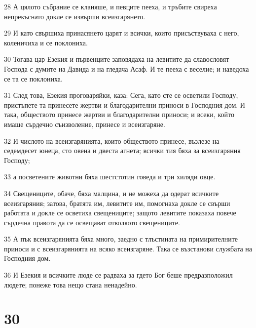 \par 28 А цялото събрание се кланяше, и певците пееха, и тръбите свиреха непрекъснато докле се извърши всеизгарянето.
\par 29 И като свършиха принасянето царят и всички, които присъствуваха с него, коленичиха и се поклониха.
\par 30 Тогава цар Езекия и първенците заповядаха на левитите да славословят Господа с думите на Давида и на гледача Асаф. И те пееха с веселие; и наведоха се та се поклониха.
\par 31 След това, Езекия проговаряйки, каза: Сега, като сте се осветили Господу, пристъпете та принесете жертви и благодарителни приноси в Господния дом. И така, обществото принесе жертви и благодарителни приноси; и всеки, който имаше сърдечно съизволение, принесе и всеизгаряне.
\par 32 И числото на всеизгарянията, които обществото принесе, възлезе на седемдесет юнеца, сто овена и двеста агнета; всички тия бяха за всеизгаряния Господу;
\par 33 а посветените животни бяха шестстотин говеда и три хиляди овце.
\par 34 Свещениците, обаче, бяха малцина, и не можеха да одерат всичките всеизгаряния; затова, братята им, левитите им, помогнаха докле се свърши работата и докле се осветиха свещениците; защото левитите показаха повече сърдечна правота да се освещават отколкото свещениците.
\par 35 А пък всеизгарянията бяха много, заедно с тлъстината на примирителните приноси и с всеизгарянията на всяко всеизгаряне. Така се възстанови службата на Господния дом.
\par 36 И Езекия и всичките люде се радваха за гдето Бог беше предразположил людете; понеже това нещо стана ненадейно.

\chapter{30}

